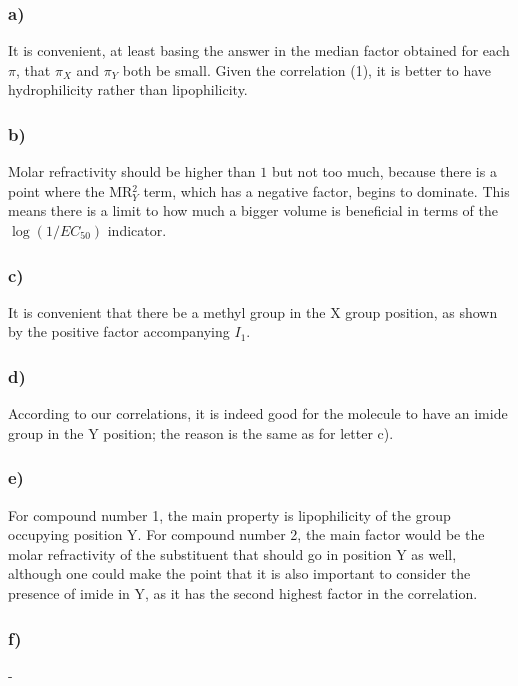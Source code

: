 \documentclass[a4paper, 12pt, notitlepage]{article}
\begin{document}
\subsubsection*{a)}
It is convenient, at least basing the answer in the median factor obtained for each $\pi$, that $\pi_X$ and $\pi_Y$ both be small. Given the correlation (1), it is better to have hydrophilicity rather than lipophilicity.
\subsubsection*{b)}
Molar refractivity should be higher than $1$ but not too much, because there is a point where the MR$_Y^2$ term, which has a negative factor, begins to dominate. This means there is a limit to how much a bigger volume is beneficial in terms of the $\log(1/EC_{50})$ indicator.
\subsubsection*{c)}
It is convenient that there be a methyl group in the X group position, as shown by the positive factor accompanying $I_1$.
\subsubsection*{d)}
According to our correlations, it is indeed good for the molecule to have an imide group in the Y position; the reason is the same as for letter c).
\subsubsection*{e)}
For compound number 1, the main property is lipophilicity of the group occupying position Y. For compound number 2, the main factor would be the molar refractivity of the substituent that should go in position Y as well, although one could make the point that it is also important to consider the presence of imide in Y, as it has the second highest factor in the correlation.
\subsubsection*{f)}
-
\end{document}
